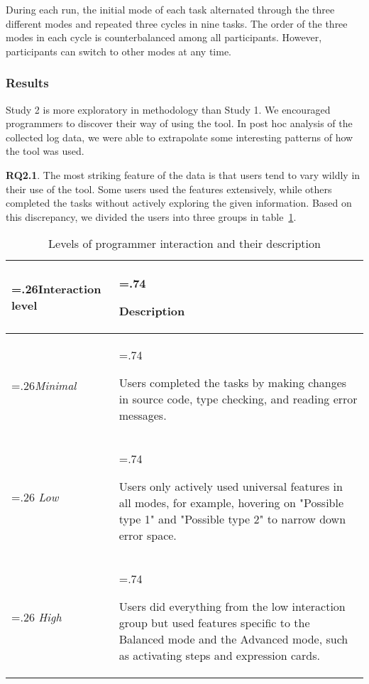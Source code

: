 During each run, the initial mode of each task alternated through the three different modes and repeated three cycles in nine tasks. The order of the three modes in each cycle is counterbalanced among all participants. However, participants can switch to other modes at any time. 




\subsubsection*{\textbf{Results}} 

Study 2 is more exploratory in methodology than Study 1. We encouraged programmers  to discover their way of using the tool. In post hoc analysis of the collected log data, we were able to extrapolate some interesting patterns of how the tool was used. 


\textbf{RQ2.1}. The most striking feature of the data is that users tend to vary wildly in their use of the tool. Some users used the features extensively, while others completed the tasks without actively exploring the given information. Based on this discrepancy, we divided the users into three groups in table~\ref{tab:interaction-level}.
\begin{table}
    \centering
\begin{scriptsize}
\begin{small}
\noindent\begin{tabularx}{\linewidth}{ 
  | >{\hsize=.26\hsize}X 
  | >{\hsize=.74\hsize \raggedright\arraybackslash}X  | }
    \hline
        Interaction level & Description \\ \hline
        \textit{Minimal}  & Users completed the tasks by making changes in source code, type checking, and reading error messages. \\ \hline
        \textit{Low}  & Users only actively used universal features in all modes, for example, hovering on "Possible type 1" and "Possible type 2" to narrow down error space. \\ \hline
        \textit{High}  & Users did everything from the low interaction group but used features specific to the Balanced mode and the Advanced mode, such as activating steps and expression cards. \\ \hline
\end{tabularx}
\end{small}
\end{scriptsize}
    \caption{Levels of programmer interaction and their description}
    \label {tab:interaction-level}
\end{table}

